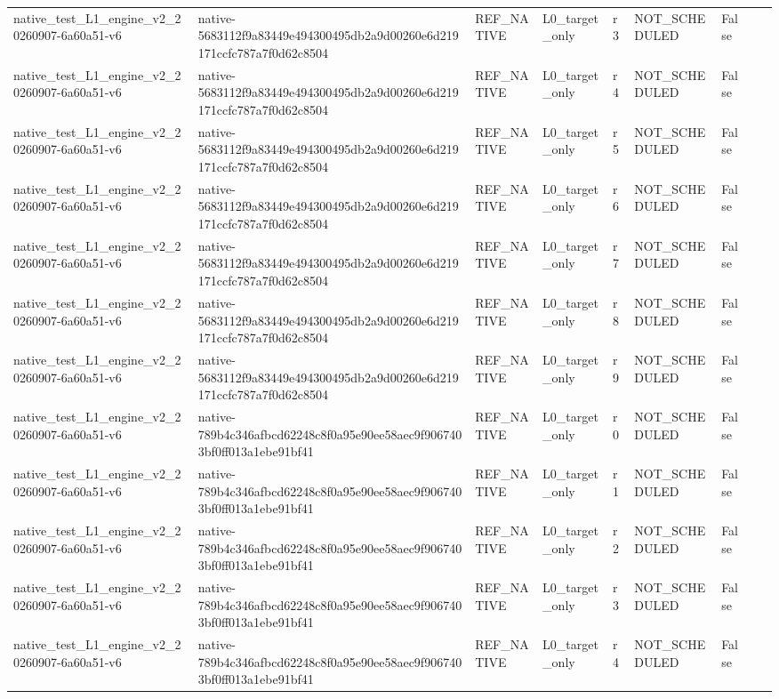 \begin{tabular}{lllllllll}
native\_test\_L1\_engine\_v2\_20260907-6a60a51-v6 & native-5683112f9a83449e494300495db2a9d00260e6d219171ccfc787a7f0d62c8504 & REF\_NATIVE & L0\_target\_only & r3 & NOT\_SCHEDULED & False &  &  \\
native\_test\_L1\_engine\_v2\_20260907-6a60a51-v6 & native-5683112f9a83449e494300495db2a9d00260e6d219171ccfc787a7f0d62c8504 & REF\_NATIVE & L0\_target\_only & r4 & NOT\_SCHEDULED & False &  &  \\
native\_test\_L1\_engine\_v2\_20260907-6a60a51-v6 & native-5683112f9a83449e494300495db2a9d00260e6d219171ccfc787a7f0d62c8504 & REF\_NATIVE & L0\_target\_only & r5 & NOT\_SCHEDULED & False &  &  \\
native\_test\_L1\_engine\_v2\_20260907-6a60a51-v6 & native-5683112f9a83449e494300495db2a9d00260e6d219171ccfc787a7f0d62c8504 & REF\_NATIVE & L0\_target\_only & r6 & NOT\_SCHEDULED & False &  &  \\
native\_test\_L1\_engine\_v2\_20260907-6a60a51-v6 & native-5683112f9a83449e494300495db2a9d00260e6d219171ccfc787a7f0d62c8504 & REF\_NATIVE & L0\_target\_only & r7 & NOT\_SCHEDULED & False &  &  \\
native\_test\_L1\_engine\_v2\_20260907-6a60a51-v6 & native-5683112f9a83449e494300495db2a9d00260e6d219171ccfc787a7f0d62c8504 & REF\_NATIVE & L0\_target\_only & r8 & NOT\_SCHEDULED & False &  &  \\
native\_test\_L1\_engine\_v2\_20260907-6a60a51-v6 & native-5683112f9a83449e494300495db2a9d00260e6d219171ccfc787a7f0d62c8504 & REF\_NATIVE & L0\_target\_only & r9 & NOT\_SCHEDULED & False &  &  \\
native\_test\_L1\_engine\_v2\_20260907-6a60a51-v6 & native-789b4c346afbcd62248c8f0a95e90ee58aec9f9067403bf0ff013a1ebe91bf41 & REF\_NATIVE & L0\_target\_only & r0 & NOT\_SCHEDULED & False &  &  \\
native\_test\_L1\_engine\_v2\_20260907-6a60a51-v6 & native-789b4c346afbcd62248c8f0a95e90ee58aec9f9067403bf0ff013a1ebe91bf41 & REF\_NATIVE & L0\_target\_only & r1 & NOT\_SCHEDULED & False &  &  \\
native\_test\_L1\_engine\_v2\_20260907-6a60a51-v6 & native-789b4c346afbcd62248c8f0a95e90ee58aec9f9067403bf0ff013a1ebe91bf41 & REF\_NATIVE & L0\_target\_only & r2 & NOT\_SCHEDULED & False &  &  \\
native\_test\_L1\_engine\_v2\_20260907-6a60a51-v6 & native-789b4c346afbcd62248c8f0a95e90ee58aec9f9067403bf0ff013a1ebe91bf41 & REF\_NATIVE & L0\_target\_only & r3 & NOT\_SCHEDULED & False &  &  \\
native\_test\_L1\_engine\_v2\_20260907-6a60a51-v6 & native-789b4c346afbcd62248c8f0a95e90ee58aec9f9067403bf0ff013a1ebe91bf41 & REF\_NATIVE & L0\_target\_only & r4 & NOT\_SCHEDULED & False &  &  \\

\end{tabular}
